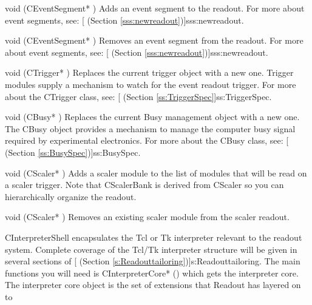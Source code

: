 \begin{description}
	    \begin{description}
		\item{void (CEventSegment* )}
		   Adds an event segment to the readout.  For more about 
		   event segments, see:
		   [
		    (Section \ref{sss:newreadout})]{sss:newreadout}.
		\item{void (CEventSegment* )}
		   Removes an event segment from the readout. 
		   For more about 
		   event segments, see:
		   [
		    (Section \ref{sss:newreadout})]{sss:newreadout}.
		\item{void (CTrigger* )}
		   Replaces the current trigger object with a new one. Trigger modules
		   supply a mechanism to watch for the event readout trigger.  For more
		   about the CTrigger class, see:
		   [
		      (Section \ref{ss:TriggerSpec}]{ss:TriggerSpec}.
		\item{void (CBusy* )}
		   Replaces the current Busy management object with a new one.
		   The CBusy object provides a mechanism to manage the 
		   computer busy signal required by experimental electronics.
		   For more about the CBusy class, see:
		   [
		      (Section \ref{ss:BusySpec})]{ss:BusySpec}.
		\item{void (CScaler* )}
		   Adds a scaler module to the list of modules that will be read
		   on a scaler trigger.  Note that CScalerBank is derived from
		   CScaler so you can hierarchically organize the readout.
		\item{void (CScaler* )}
		   Removes an existing scaler module from the scaler readout.
	     \end{description}
	     \htmlrule
	    \item{CInterpreterShell} encapsulates the Tcl or Tk interpreter
	       relevant to the readout system. Complete coverage of the
	       Tcl/Tk interpreter structure will be given in several sections
	       of [
		  (Section \ref{s:Readouttailoring})]{s:Readouttailoring}.
	       The main functions you will need is 
	       CInterpreterCore* () 
	       which gets the interpreter core.  The interpreter core object
	       is the set of extensions that Readout has layered on to

\end{description}
